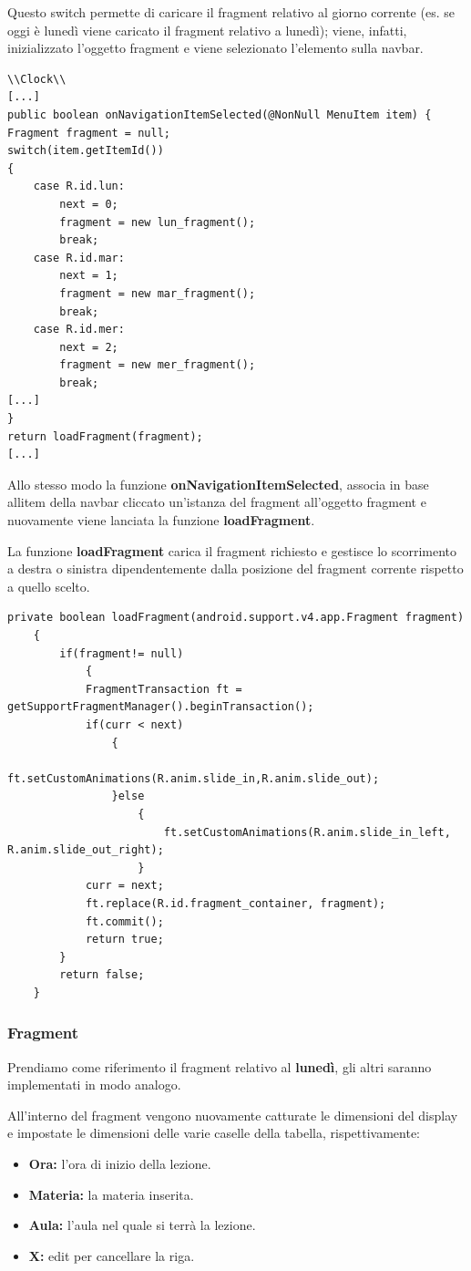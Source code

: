 \documentclass[a4paper, 50pt, twoside]{article}
\begin{document}
Questo switch permette di caricare il fragment relativo al giorno corrente (es. se oggi è lunedì viene caricato il fragment relativo a lunedì); viene, infatti, inizializzato l'oggetto fragment e viene selezionato l'elemento sulla navbar.

\begin{lstlisting}
\\Clock\\
[...]
public boolean onNavigationItemSelected(@NonNull MenuItem item) {
Fragment fragment = null;
switch(item.getItemId())
{
	case R.id.lun:
		next = 0;
		fragment = new lun_fragment();
		break;
	case R.id.mar:
		next = 1;
		fragment = new mar_fragment();
		break;
	case R.id.mer:
		next = 2;
		fragment = new mer_fragment();
		break;
[...]
}
return loadFragment(fragment);
[...]
\end{lstlisting}

Allo stesso modo la funzione \textbf{onNavigationItemSelected}, associa in base allitem della navbar cliccato un'istanza del fragment all'oggetto fragment e nuovamente viene lanciata la funzione \textbf{loadFragment}.

La funzione \textbf{loadFragment} carica il fragment richiesto e gestisce lo scorrimento a destra o sinistra dipendentemente dalla posizione del fragment corrente rispetto a quello scelto.
\begin{lstlisting}
private boolean loadFragment(android.support.v4.app.Fragment fragment)
    {
        if(fragment!= null)
            {
            FragmentTransaction ft = 
getSupportFragmentManager().beginTransaction();
            if(curr < next)
                {
                    ft.setCustomAnimations(R.anim.slide_in,R.anim.slide_out);
                }else
                    {
                        ft.setCustomAnimations(R.anim.slide_in_left,
R.anim.slide_out_right);
                    }
            curr = next;
            ft.replace(R.id.fragment_container, fragment);
            ft.commit();
            return true;
        }
        return false;
    }
\end{lstlisting}
\subsubsection{Fragment}
Prendiamo come riferimento il fragment relativo al \textbf{lunedì}, gli altri saranno implementati in modo analogo.

All'interno del fragment vengono nuovamente catturate le dimensioni del display e impostate le dimensioni delle varie caselle della tabella, rispettivamente:
\begin{itemize}
\item \textbf{Ora:} l'ora di inizio della lezione.
\item \textbf{Materia:} la materia inserita.
\item \textbf{Aula:} l'aula nel quale si terrà la lezione.
\item \textbf{X:} edit per cancellare la riga.
\end{itemize}
\end{document}
